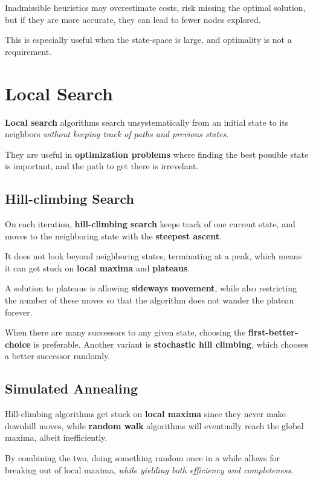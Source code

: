        Inadmissible heuristics may overestimate costs, risk missing the optimal solution, but if they are more accurate, they can lead to fewer nodes explored.

        This is especially useful when the state-space is large, and optimality is not a requirement.

\section{Local Search}
    \textbf{Local search} algorithms search unsystematically from an initial state to its neighbors \emph{without keeping track of paths and previous states}.

    They are useful in \textbf{optimization problems} where finding the best possible state is important, and the path to get there is irrevelant.

    \subsection{Hill-climbing Search}
        On each iteration, \textbf{hill-climbing search} keeps track of one current state, and moves to the neighboring state with the \textbf{steepest ascent}.

        It does not look beyond neighboring states, terminating at a peak, which means it can get stuck on \textbf{local maxima} and \textbf{plateaus}.

        A solution to plateaus is allowing \textbf{sideways movement}, while also restricting the number of these moves so that the algorithm does not wander the plateau forever.

        When there are many successors to any given state, choosing the \textbf{first-better-choice} is preferable. Another variant is \textbf{stochastic hill climbing}, which chooses a better successor randomly.

    \subsection{Simulated Annealing}
        Hill-climbing algorithms get stuck on \textbf{local maxima} since they never make downhill moves, while \textbf{random walk} algorithms will eventually reach the global maxima, albeit inefficiently.

        By combining the two, doing something random once in a while allows for breaking out of local maxima, \emph{while yielding both efficiency and completeness}.

